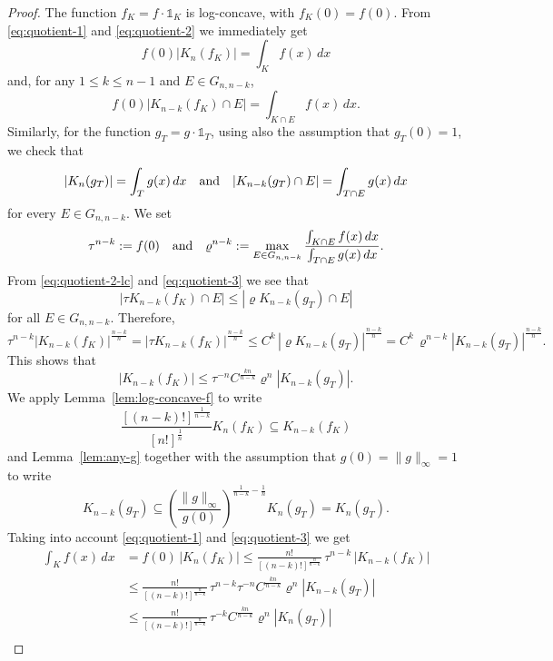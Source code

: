 \documentclass[11pt,leqno]{article}
\theoremstyle{definition}
\theoremstyle{remark}
\numberwithin{equation}{section}
\newcommand{\ls}{\leqslant}
\newcommand{\1}{\textbf{1}}
\begin{document}
\begin{proof}The function $f_K=f\cdot\mathds{1}_K$ is log-concave, with $f_K(0)=f(0)$.
From \eqref{eq:quotient-1} and \eqref{eq:quotient-2} we immediately get
\begin{equation}\label{eq:quotient-1-lc}
f(0)|K_n(f_K)|=\int_Kf(x)\,dx
\end{equation}
and, for any $1\ls k\ls n-1$ and $E\in G_{n,n-k}$,
\begin{equation}\label{eq:quotient-2-lc}
f(0)|K_{n-k}(f_K)\cap E|=\int_{K\cap E}f(x)\,dx.
\end{equation}
Similarly, for the function $g_T=g\cdot\mathds{1}_T$, using also the assumption that $g_T(0)=1$, we check that
\begin{equation}\label{eq:quotient-3}|K_n(g_T)| =\int_Tg(x)\,dx\quad\hbox{and}\quad
|K_{n-k}(g_T)\cap E| =\int_{T\cap E}g(x)\,dx\end{equation}
for every $E\in G_{n,n-k}$.
We set $$\tau^{n-k}:=f(0)\quad\hbox{and}\quad\varrho^{n-k}:=\max_{E\in G_{n,n-k}} \frac{\int_{K\cap E} f(x)\,dx}{\int_{T\cap E} g(x)\,dx}.$$
From \eqref{eq:quotient-2-lc} and \eqref{eq:quotient-3} we see that
$$|\tau K_{n-k}(f_{K})\cap E|\ls |\varrho K_{n-k}(g_{T})\cap E|$$
for all $E\in G_{n,n-k}$. Therefore,
$$\tau^{n-k}|K_{n-k}(f_K)|^{\frac{n-k}{n}}=|\tau K_{n-k}(f_K)|^{\frac{n-k}{n}}\ls C^k\,|\varrho K_{n-k}(g_T)|^{\frac{n-k}{n}}=C^k\,\varrho^{n-k}|K_{n-k}(g_T)|^{\frac{n-k}{n}}.$$
This shows that
$$|K_{n-k}(f_K)|\ls \tau^{-n}C^{\frac{kn}{n-k}}\varrho^n|K_{n-k}(g_T)|.$$
We apply Lemma~\ref{lem:log-concave-f} to write
\begin{equation}\label{eq:quotient-4} \frac{[(n-k)!]^{\frac{1}{n-k}}}{[n!]^{\frac{1}{n}}}K_n(f_K)\subseteq
K_{n-k}(f_K)\end{equation}
and Lemma~\ref{lem:any-g} together with the assumption that $g(0)=\|g\|_{\infty}=1$ to write
\begin{equation}\label{eq:quotient-5}K_{n-k}(g_T)\subseteq
\left(\frac{\|g\|_{\infty}}{g(0)}\right)^{\frac{1}{n-k}-\frac{1}{n}}K_{n}(g_T)=K_n(g_T).
\end{equation}
Taking into account \eqref{eq:quotient-1} and \eqref{eq:quotient-3} we get
\begin{align*}
\int_Kf(x)\,dx &=f(0)\,|K_n(f_K)|\ls \frac{n!}{[(n-k)!]^{\frac{n}{n-k}}}\,\tau^{n-k}\,|K_{n-k}(f_K)|\\
&\ls \frac{n!}{[(n-k)!]^{\frac{n}{n-k}}}\, \tau^{n-k}\tau^{-n} C^{\frac{kn}{n-k}}\varrho^{n}|K_{n-k}(g_T)|\\
&\ls \frac{n!}{[(n-k)!]^{\frac{n}{n-k}}}\, \tau^{-k} C^{\frac{kn}{n-k}}\varrho^{n}|K_n(g_T)|\\

\end{align*}
\end{proof}
\end{document}
